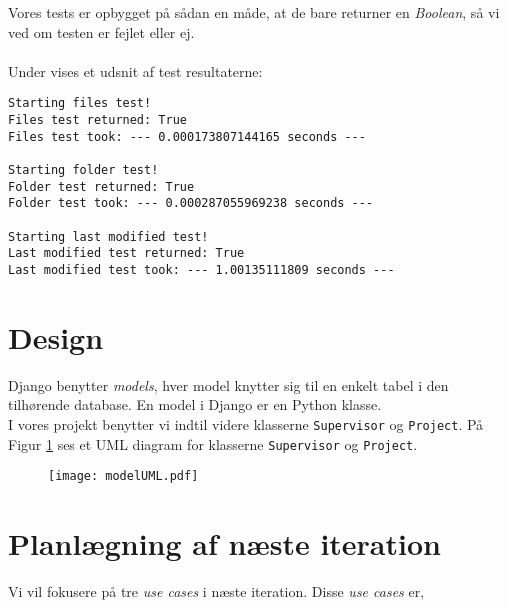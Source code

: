 \documentclass[11pt]{article}
\begin{document}
Vores tests er opbygget på sådan en måde, at de bare returner en \textit{Boolean}, så vi ved om testen er fejlet eller ej. \\ \\
Under vises et udsnit af test resultaterne:
\begin{lstlisting}
Starting files test!
Files test returned: True
Files test took: --- 0.000173807144165 seconds ---

Starting folder test!
Folder test returned: True
Folder test took: --- 0.000287055969238 seconds ---

Starting last modified test!
Last modified test returned: True
Last modified test took: --- 1.00135111809 seconds ---
\end{lstlisting}




\section{Design}
Django benytter \textit{models}, hver model knytter sig til en enkelt tabel i den tilhørende database. En model i Django er en Python klasse. \\ I vores projekt benytter vi indtil videre klasserne \texttt{Supervisor} og \texttt{Project}. På Figur \ref{fig:modelUML} ses et UML diagram for klasserne \texttt{Supervisor} og \texttt{Project}.


\begin{figure}
			\centering
			\texttt{[image: modelUML.pdf]}
			\caption{}
			\label{fig:modelUML}
\end{figure}



\section{Planlægning af næste iteration}
Vi vil fokusere på tre \textit{use cases} i næste iteration. Disse \textit{use cases} er,
\end{document}
